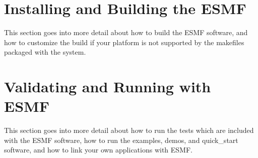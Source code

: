 
\setlength{\parskip}{1.5ex}
\setlength{\parindent}{0em}

\section{Installing and Building the ESMF}
\label{sec:TechOver}

This section goes into more detail about how to build
the ESMF software, and how to customize the build if
your platform is not supported by the makefiles packaged
with the system.



%

\section{Validating and Running with ESMF}
\label{sec:TechOver2}

This section goes into more detail about how to run the tests which are
included with the ESMF software, how to run the examples, demos, and
quick\_start software, and how to link your own applications with ESMF.





